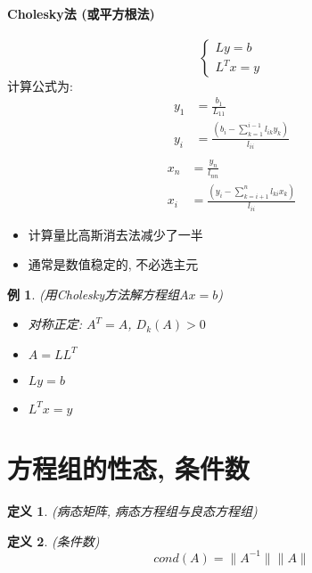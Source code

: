 \documentclass[twoside]{article}
\newtheorem{definition}{定义}[section]
\newtheorem{eg}{例}[section]
\begin{document}
\paragraph{Cholesky法 (或平方根法)}
\begin{equation}
  \begin{cases}
    Ly=b \\
    L^Tx=y
  \end{cases}
\end{equation}
计算公式为:
\begin{equation}
  \begin{aligned}
    y_1&=\frac{b_1}{L_{11}} \\
    y_i&=\frac{(b_i-\sum^{i-1}_{k=1} l_{ik} y_k)}{l_{ii}} \\
  \end{aligned}
\end{equation}
\begin{equation}
  \begin{aligned}
    x_n&=\frac{y_n}{l_{nn}} \\
    x_i&=\frac{(y_i-\sum^n_{k=i+1}l_{ki}x_k)}{l_{ii}}
  \end{aligned}
\end{equation}
\begin{itemize}
  \item 计算量比高斯消去法减少了一半
  \item 通常是数值稳定的, 不必选主元
\end{itemize}
\begin{eg}
  (用Cholesky方法解方程组$Ax=b$)
  \begin{itemize}
    \item 对称正定: $A^T=A$, $D_k(A)>0$
    \item $A=LL^T$
    \item $Ly=b$
    \item $L^Tx=y$
  \end{itemize}
\end{eg}

\section{方程组的性态, 条件数}
\begin{definition}
  (病态矩阵, 病态方程组与良态方程组)
\end{definition}
\begin{definition}
  (条件数)
  \begin{equation}
    cond(A)=\|A^{-1}\| \|A\|
  \end{equation}
\end{definition}
\end{document}
